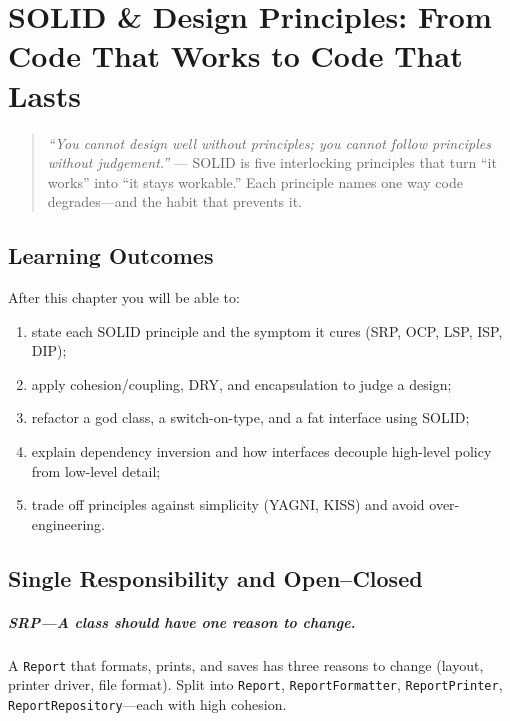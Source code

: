 \chapter[SOLID \& Design Principles]{SOLID \& Design Principles: From Code That Works to Code That Lasts}
\label{ch:solid}

\begin{quote}
\emph{``You cannot design well without principles; you cannot follow principles without judgement.''} --- SOLID is five interlocking principles that turn ``it works'' into ``it stays workable.'' Each principle names one way code degrades---and the habit that prevents it.
\end{quote}

\noindent{}
\vspace{0.4em}

\section*{Learning Outcomes}
After this chapter you will be able to:
\begin{enumerate}[label=(L\arabic*)]
    \item state each SOLID principle and the symptom it cures (SRP, OCP, LSP, ISP, DIP);
    \item apply cohesion/coupling, DRY, and encapsulation to judge a design;
    \item refactor a god class, a switch-on-type, and a fat interface using SOLID;
    \item explain dependency inversion and how interfaces decouple high-level policy from low-level detail;
    \item trade off principles against simplicity (YAGNI, KISS) and avoid over-engineering.
\end{enumerate}

\section{Single Responsibility and Open--Closed}
\label{sec:srp-ocp}
\paragraph{SRP---A class should have one reason to change.} A \texttt{Report} that formats, prints, and saves has three reasons to change (layout, printer driver, file format). Split into \texttt{Report}, \texttt{ReportFormatter}, \texttt{ReportPrinter}, \texttt{ReportRepository}---each with high cohesion.

